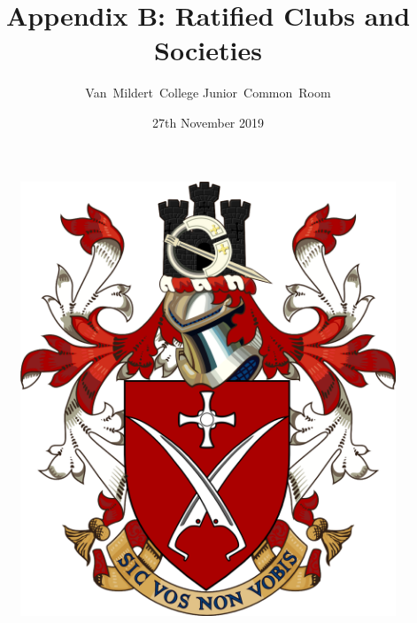 \documentclass[12pt]{article}  %
\title{Appendix B: Ratified Clubs and Societies}
\author{Van~Mildert~College Junior~Common~Room}
\date{27th November 2019}
\begin{document}
\begin{titlepage}  %
\maketitle
\begin{figure}[h]
\includegraphics[scale=0.25]{arms}  %
\centering
\end{figure}
\thispagestyle{empty}
\end{titlepage}
\setcounter{page}{2}  %
\end{document}
